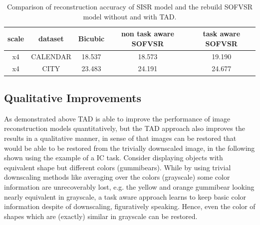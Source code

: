 \begin{table}[!htbp]
	\begin{center}
	\begin{tabular}{c|c|c|c|c}
	scale & dataset & Bicubic  & non task aware SOFVSR
	& task aware SOFVSR \\
	\hline
  x4 & CALENDAR & 18.537 & 18.573  & 19.190 \\
	x4 & CITY & 23.483 & 24.191 & 24.677 \\
	\end{tabular}
	\caption{Comparison of reconstruction accuracy of \ac{SISR} model and
	the rebuild SOFVSR model without and with \ac{TAD}.}
	\label{table:vsrperformance}
	\end{center}
\end{table}

\subsection{Qualitative Improvements}
\label{sec:Experiments_QI}
As demonstrated above \ac{TAD} is able to improve the performance of
image reconstruction models quantitatively, but the \ac{TAD} approach also
improves the results in a qualitative manner, in sense of that images can be
restored that would be able to be restored from the trivially downscaled image,
in the following shown using the example of a \ac{IC} task.
\newline
Consider  displaying objects with equivalent shape
but different colors (gummibears). While by using trivial downscaling methods
like averaging over the colors (grayscale) some color information are
unrecoverably lost, e.g. the yellow and orange gummibear looking nearly
equivalent in grayscale, a task aware approach learns to keep basic color
information despite of downscaling, figuratively speaking. Hence, even the color
of shapes which are (exactly) similar in grayscale can be restored.

